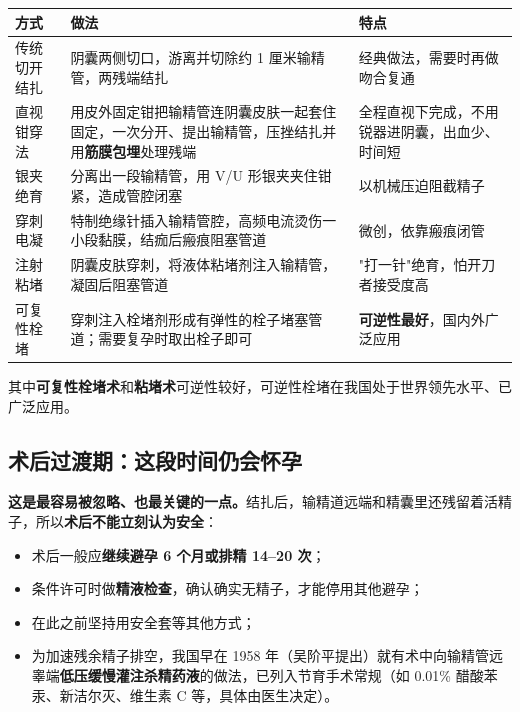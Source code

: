 \documentclass[12pt,UTF8,openany]{ctexbook}
\begin{document}
\begin{center}
\renewcommand{\arraystretch}{1.3}
\begin{tabularx}{\textwidth}{|X|X|X|}
\hline
\textbf{方式} & \textbf{做法} & \textbf{特点} \\
\hline
传统切开结扎 & 阴囊两侧切口，游离并切除约 1 厘米输精管，两残端结扎 & 经典做法，需要时再做吻合复通 \\
\hline
直视钳穿法 & 用皮外固定钳把输精管连阴囊皮肤一起套住固定，一次分开、提出输精管，压挫结扎并用\textbf{筋膜包埋}处理残端 & 全程直视下完成，不用锐器进阴囊，出血少、时间短 \\
\hline
银夹绝育 & 分离出一段输精管，用 V/U 形银夹夹住钳紧，造成管腔闭塞 & 以机械压迫阻截精子 \\
\hline
穿刺电凝 & 特制绝缘针插入输精管腔，高频电流烫伤一小段黏膜，结痂后瘢痕阻塞管道 & 微创，依靠瘢痕闭管 \\
\hline
注射粘堵 & 阴囊皮肤穿刺，将液体粘堵剂注入输精管，凝固后阻塞管道 & "打一针"绝育，怕开刀者接受度高 \\
\hline
可复性栓堵 & 穿刺注入栓堵剂形成有弹性的栓子堵塞管道；需要复孕时取出栓子即可 & \textbf{可逆性最好}，国内外广泛应用 \\
\hline
\end{tabularx}
\end{center}

其中\textbf{可复性栓堵术}和\textbf{粘堵术}可逆性较好，可逆性栓堵在我国处于世界领先水平、已广泛应用。

\subsection*{术后过渡期：这段时间仍会怀孕}

\textbf{这是最容易被忽略、也最关键的一点。}结扎后，输精道远端和精囊里还残留着活精子，所以\textbf{术后不能立刻认为安全}：

\begin{itemize}
  \item 术后一般应\textbf{继续避孕 6 个月或排精 14–20 次}；
  \item 条件许可时做\textbf{精液检查}，确认确实无精子，才能停用其他避孕；
  \item 在此之前坚持用安全套等其他方式；
  \item 为加速残余精子排空，我国早在 1958 年（吴阶平提出）就有术中向输精管远睾端\textbf{低压缓慢灌注杀精药液}的做法，已列入节育手术常规（如 0.01\% 醋酸苯汞、新洁尔灭、维生素 C 等，具体由医生决定）。
\end{itemize}
\end{document}
